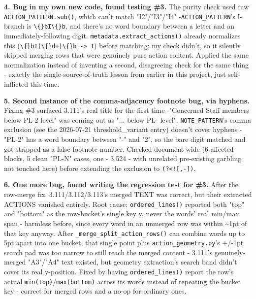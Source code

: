 \textbf{4. Bug in my own new code, found testing \#3.} The purity check used raw \texttt{ACTION\_\allowbreak{}PATTERN.sub()}, which can't match "I2"/"I3"/"I4" -\texttt{ACTION\_\allowbreak{}PATTERN}'s I-branch is \texttt{\textbackslash\{\}bI\textbackslash\{\}b}, and there's no word boundary between a letter and an immediately-following digit. \texttt{metadata.extract\_\allowbreak{}actions()} already normalizes this (\texttt{\textbackslash\{\}bI(\textbackslash\{\}d+)\textbackslash\{\}b -> I}) before matching; my check didn't, so it silently skipped merging rows that were genuinely pure action content. Applied the same normalization instead of inventing a second, disagreeing check for the same thing - exactly the single-source-of-truth lesson from earlier in this project, just self-inflicted this time.

\textbf{5. Second instance of the comma-adjacency footnote bug, via hyphens.} Fixing \#3 surfaced 3.111's real title for the first time -"Concerned Staff members below PL-2 level" was coming out as "... below PL- level". \texttt{NOTE\_\allowbreak{}PATTERN}'s comma exclusion (see the 2026-07-21 threshold\_variant entry) doesn't cover hyphens - "PL-2" has a word boundary between "-" and "2", so the bare digit matched and got stripped as a false footnote number. Checked document-wide (6 affected blocks, 5 clean "PL-N" cases, one - 3.524 - with unrelated pre-existing garbling not touched here) before extending the exclusion to \texttt{(?<![,-])}.

\textbf{6. One more bug, found writing the regression test for \#3.} After the row-merge fix, 3.111/3.112/3.113's merged TEXT was correct, but their extracted ACTIONS vanished entirely. Root cause: \texttt{ordered\_\allowbreak{}lines()} reported both "top" and "bottom" as the row-bucket's single key y, never the words' real min/max span - harmless before, since every word in an unmerged row was within \textasciitilde{}1pt of that key anyway. After \texttt{\_\allowbreak{}merge\_\allowbreak{}split\_\allowbreak{}action\_\allowbreak{}rows()} can combine words up to 5pt apart into one bucket, that single point plus \texttt{action\_\allowbreak{}geometry.py}'s +/-1pt search pad was too narrow to still reach the merged content - 3.111's genuinely-merged "A3"/"A4" text existed, but geometry extraction's search band didn't cover its real y-position. Fixed by having \texttt{ordered\_\allowbreak{}lines()} report the row's actual \texttt{min(top)}/\texttt{max(bottom)} across its words instead of repeating the bucket key - correct for merged rows and a no-op for ordinary ones.

